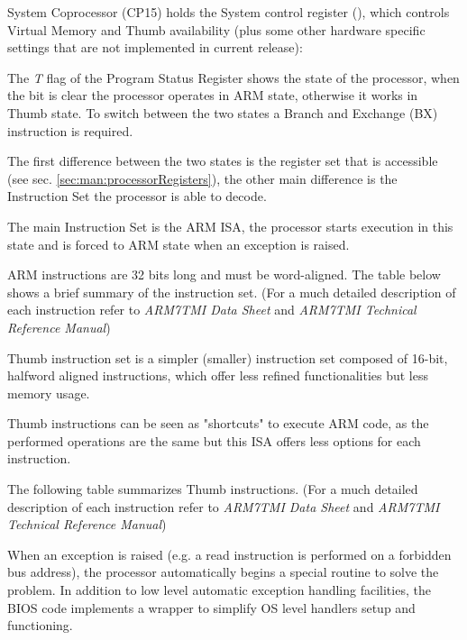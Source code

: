 \label{sec:manual:systemControlRegister}

System Coprocessor (CP15) holds the System control register (), which controls Virtual Memory and Thumb availability (plus some other hardware specific settings that are not implemented in current release):



The \emph{T} flag of the Program Status Register shows the state of the processor, when the bit is clear the processor operates in ARM state, otherwise it works in Thumb state. To switch between the two states a Branch and Exchange (BX) instruction is required.

The first difference between the two states is the register set that is accessible (see sec. \ref{sec:man:processorRegisters}), the other main difference is the Instruction Set the processor is able to decode.


The main Instruction Set is the ARM ISA, the processor starts execution in this state and is forced to ARM state when an exception is raised.

ARM instructions are 32 bits long and must be word-aligned. The table below shows a brief summary of the instruction set. (For a much detailed description of each instruction refer to \emph{ARM7TMI Data Sheet} and \emph{ARM7TMI Technical Reference Manual})



Thumb instruction set is a simpler (smaller) instruction set composed of 16-bit, halfword aligned instructions, which offer less refined functionalities but less memory usage.

Thumb instructions can be seen as "shortcuts" to execute ARM code, as the performed operations are the same but this ISA offers less options for each instruction.

The following table summarizes Thumb instructions. (For a much detailed description of each instruction refer to \emph{ARM7TMI Data Sheet} and \emph{ARM7TMI Technical Reference Manual})


\label{sec:man:exceptionHandling}

When an exception is raised (e.g. a read instruction is performed on a forbidden bus address), the processor automatically begins a special routine to solve the problem. 
In addition to low level automatic exception handling facilities, the BIOS code implements a wrapper to simplify OS level handlers setup and functioning.

